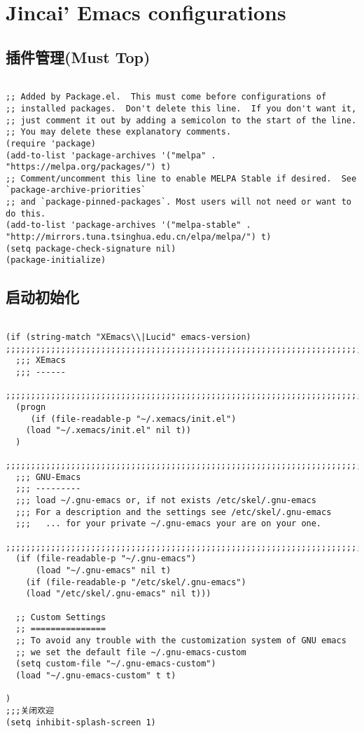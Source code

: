 \documentclass[11pt]{article}
\author{jincai}
\date{\today}
\title{}
\begin{document}
\tableofcontents

\section{Jincai' Emacs configurations}
\label{sec:org5c4a345}


\subsection{插件管理(Must Top)}
\label{sec:org1750056}

\begin{verbatim}

;; Added by Package.el.  This must come before configurations of
;; installed packages.  Don't delete this line.  If you don't want it,
;; just comment it out by adding a semicolon to the start of the line.
;; You may delete these explanatory comments.
(require 'package)
(add-to-list 'package-archives '("melpa" . "https://melpa.org/packages/") t)
;; Comment/uncomment this line to enable MELPA Stable if desired.  See `package-archive-priorities`
;; and `package-pinned-packages`. Most users will not need or want to do this.
(add-to-list 'package-archives '("melpa-stable" . "http://mirrors.tuna.tsinghua.edu.cn/elpa/melpa/") t)
(setq package-check-signature nil)
(package-initialize)

\end{verbatim}

\subsection{启动初始化}
\label{sec:org3e69e01}

\begin{verbatim}

(if (string-match "XEmacs\\|Lucid" emacs-version)
;;;;;;;;;;;;;;;;;;;;;;;;;;;;;;;;;;;;;;;;;;;;;;;;;;;;;;;;;;;;;;;;;;;;;;;;;
  ;;; XEmacs
  ;;; ------
  ;;;;;;;;;;;;;;;;;;;;;;;;;;;;;;;;;;;;;;;;;;;;;;;;;;;;;;;;;;;;;;;;;;;;;;;;;
  (progn
     (if (file-readable-p "~/.xemacs/init.el")
	(load "~/.xemacs/init.el" nil t))
  )
  ;;;;;;;;;;;;;;;;;;;;;;;;;;;;;;;;;;;;;;;;;;;;;;;;;;;;;;;;;;;;;;;;;;;;;;;;;
  ;;; GNU-Emacs
  ;;; ---------
  ;;; load ~/.gnu-emacs or, if not exists /etc/skel/.gnu-emacs
  ;;; For a description and the settings see /etc/skel/.gnu-emacs
  ;;;   ... for your private ~/.gnu-emacs your are on your one.
  ;;;;;;;;;;;;;;;;;;;;;;;;;;;;;;;;;;;;;;;;;;;;;;;;;;;;;;;;;;;;;;;;;;;;;;;;;
  (if (file-readable-p "~/.gnu-emacs")
      (load "~/.gnu-emacs" nil t)
    (if (file-readable-p "/etc/skel/.gnu-emacs")
	(load "/etc/skel/.gnu-emacs" nil t)))

  ;; Custom Settings
  ;; ===============
  ;; To avoid any trouble with the customization system of GNU emacs
  ;; we set the default file ~/.gnu-emacs-custom
  (setq custom-file "~/.gnu-emacs-custom")
  (load "~/.gnu-emacs-custom" t t)

)
;;;关闭欢迎
(setq inhibit-splash-screen 1)

\end{verbatim}
\end{document}

